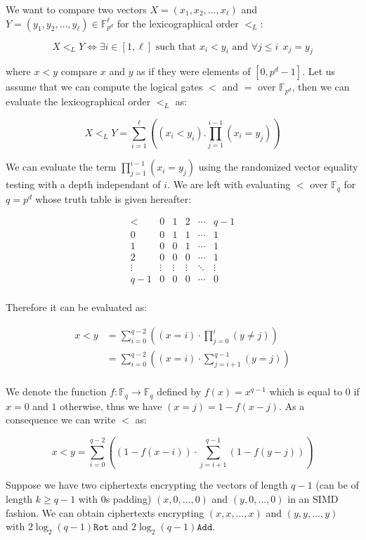 We want to compare two vectors $X=(x_1,x_2,\ldots,x_\ell)$ and $Y=(y_1,y_2,\ldots,y_\ell)\in\mathbb{F}_{p^d}^\ell$ for the lexicographical order $<_L$:

$$X <_L Y \Leftrightarrow \exists i\in[1,\ell] \text{ such that } x_i < y_i \text{ and } \forall j\leq i ~~ x_j = y_j $$

where $x<y$ compare $x$ and $y$ as if they were elements of $[0,p^d-1]$. Let us assume that we can compute the logical gates $<$ and $=$ over $\mathbb{F}_{p^d}$, then we can evaluate the lexicographical order $<_L$ as: 

$$ X <_L Y = \sum_{i=1}^\ell \left( (x_i < y_i).\prod_{j=1}^{i-1} (x_i = y_j) \right)$$

We can evaluate the term $\prod_{j=1}^{i-1} (x_i = y_j)$ using the randomized vector equality testing with a depth independant of $i$. We are left with evaluating $<$ over $\mathbb{F}_q$ for $q=p^d$ whose truth table is given hereafter:

$$
\begin{array}{c|ccccc}
  < & 0 & 1 & 2 & \cdots & q-1 \\
  \hline
  0 & 0 & 1 & 1 & \cdots & 1 \\
  1 & 0 & 0 & 1 & \cdots & 1 \\
  2 & 0 & 0 & 0 & \cdots & 1 \\
  \vdots & \vdots & \vdots & \vdots & \ddots & \vdots \\
  q-1 & 0 & 0 & 0 & \cdots & 0 \\
\end{array}
$$

Therefore it can be evaluated as:

\begin{align*}
  x < y & = \sum_{i=0}^{q-2} \left( (x = i)\cdot \prod_{j=0}^i (y \neq j) \right) \\
        & = \sum_{i=0}^{q-2} \left( (x = i)\cdot \sum_{j=i+1}^{q-1} (y = j) \right) \\
\end{align*}

We denote the function $f: \mathbb{F}_q \rightarrow \mathbb{F}_q$ defined by $f(x) = x^{q-1}$ which is equal to $0$ if $x = 0$ and $1$ otherwise, thus we have $(x = j) = 1-f(x-j)$. As a consequence we can write $<$ as:

$$ x < y = \sum_{i=0}^{q-2} \left( (1-f(x-i)) \cdot \sum_{j=i+1}^{q-1} (1 - f(y-j)) \right) $$

Suppose we have two ciphertexts encrypting the vectors of length $q-1$ (can be of length $k\geq q-1$ with $0$s padding) $(x,0,\ldots,0)$ and $(y,0,\ldots,0)$ in an SIMD fashion. We can obtain ciphertexts encrypting $(x,x,\ldots, x)$ and $(y,y,\ldots, y)$ with $2\log_2(q-1)\texttt{Rot}$ and $2\log_2(q-1)\texttt{Add}$. 

